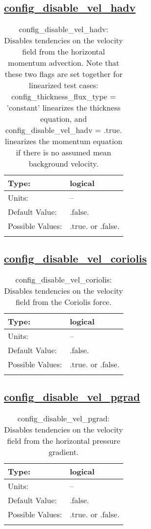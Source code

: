 \subsection[config\_disable\_vel\_hadv]{\hyperref[sec:nm_tab_debug]{config\_disable\_vel\_hadv}}
\label{subsec:nm_sec_config_disable_vel_hadv}
\begin{center}
\begin{longtable}{| p{2.0in} || p{4.0in} |}
    \hline
    Type: & logical \\
    \hline
    Units: & -- \\
    \hline
    Default Value: & .false. \\
    \hline
    Possible Values: & .true. or .false. \\
    \hline
    \caption{config\_disable\_vel\_hadv: Disables tendencies on the velocity field from the horizontal momentum advection. Note that these two flags are set together for linearized test cases: config\_thickness\_flux\_type = 'constant' linearizes the thickness equation, and config\_disable\_vel\_hadv = .true. linearizes the momentum equation if there is no assumed mean background velocity.}
\end{longtable}
\end{center}
\subsection[config\_disable\_vel\_coriolis]{\hyperref[sec:nm_tab_debug]{config\_disable\_vel\_coriolis}}
\label{subsec:nm_sec_config_disable_vel_coriolis}
\begin{center}
\begin{longtable}{| p{2.0in} || p{4.0in} |}
    \hline
    Type: & logical \\
    \hline
    Units: & -- \\
    \hline
    Default Value: & .false. \\
    \hline
    Possible Values: & .true. or .false. \\
    \hline
    \caption{config\_disable\_vel\_coriolis: Disables tendencies on the velocity field from the Coriolis force.}
\end{longtable}
\end{center}
\subsection[config\_disable\_vel\_pgrad]{\hyperref[sec:nm_tab_debug]{config\_disable\_vel\_pgrad}}
\label{subsec:nm_sec_config_disable_vel_pgrad}
\begin{center}
\begin{longtable}{| p{2.0in} || p{4.0in} |}
    \hline
    Type: & logical \\
    \hline
    Units: & -- \\
    \hline
    Default Value: & .false. \\
    \hline
    Possible Values: & .true. or .false. \\
    \hline
    \caption{config\_disable\_vel\_pgrad: Disables tendencies on the velocity field from the horizontal pressure gradient.}
\end{longtable}
\end{center}
